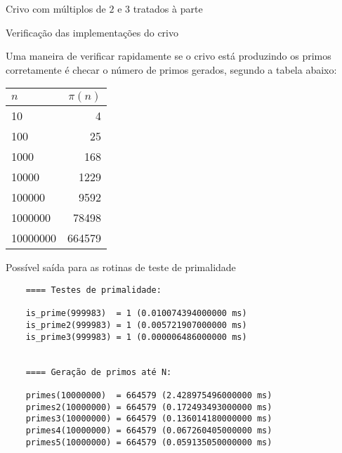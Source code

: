 \begin{frame}[fragile]{Crivo com múltiplos de $2$ e $3$ tratados à parte}
\end{frame}

\begin{frame}[fragile]{Verificação das implementações do crivo}

Uma maneira de verificar rapidamente se o crivo está produzindo os primos corretamente é checar o
número de primos gerados, segundo a tabela abaixo:

\begin{table}[!h]
    \centering
    \begin{tabular}{lr}
        \toprule
        $n$ & $\pi(n)$\\
        \midrule
        10 & 4 \\
        100 & 25 \\
        1000 & 168 \\
        10000 & 1229 \\
        100000 & 9592 \\
        1000000 & 78498 \\
        10000000 & 664579 \\
        \bottomrule
    \end{tabular}
\end{table}

\end{frame}

\begin{frame}[fragile]{Possível saída para as rotinas de teste de primalidade}
    \begin{footnotesize}
    \begin{verbatim}
    ==== Testes de primalidade:

    is_prime(999983)  = 1 (0.010074394000000 ms)
    is_prime2(999983) = 1 (0.005721907000000 ms)
    is_prime3(999983) = 1 (0.000006486000000 ms)


    ==== Geração de primos até N:

    primes(10000000)  = 664579 (2.428975496000000 ms)
    primes2(10000000) = 664579 (0.172493493000000 ms)
    primes3(10000000) = 664579 (0.136014180000000 ms)
    primes4(10000000) = 664579 (0.067260405000000 ms)
    primes5(10000000) = 664579 (0.059135050000000 ms)
    \end{verbatim}
    \end{footnotesize}
\end{frame}

